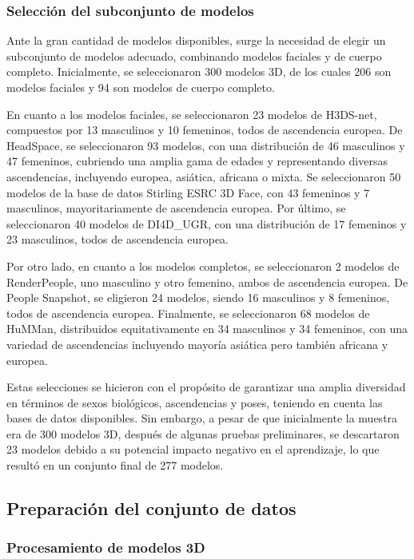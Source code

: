 \subsubsection{Selección del subconjunto de modelos}

Ante la gran cantidad de modelos disponibles, surge la necesidad de elegir un subconjunto de modelos adecuado, combinando modelos faciales y de cuerpo completo.
Inicialmente, se seleccionaron 300 modelos 3D, de los cuales 206 son modelos faciales y 94 son modelos de cuerpo completo.

En cuanto a los modelos faciales, se seleccionaron 23 modelos de H3DS-net, compuestos por 13 masculinos y 10 femeninos, todos de ascendencia europea. De HeadSpace, se seleccionaron 93 modelos, con una distribución de 46 masculinos y 47 femeninos, cubriendo una amplia gama de edades y representando diversas ascendencias, incluyendo europea, asiática, africana o mixta. Se seleccionaron 50 modelos de la base de datos Stirling ESRC 3D Face, con 43 femeninos y 7 masculinos, mayoritariamente de ascendencia europea. Por último, se seleccionaron 40 modelos de DI4D\_UGR, con una distribución de 17 femeninos y 23 masculinos, todos de ascendencia europea.

Por otro lado, en cuanto a los modelos completos, se seleccionaron 2 modelos de RenderPeople, uno masculino y otro femenino, ambos de ascendencia europea. De People Snapshot, se eligieron 24 modelos, siendo 16 masculinos y 8 femeninos, todos de ascendencia europea. Finalmente, se seleccionaron 68 modelos de HuMMan, distribuidos equitativamente en 34 masculinos y 34 femeninos, con una variedad de ascendencias incluyendo mayoría asiática pero también africana y europea.

Estas selecciones se hicieron con el propósito de garantizar una amplia diversidad en términos de sexos biológicos, ascendencias y poses, teniendo en cuenta las bases de datos disponibles. Sin embargo, a pesar de que inicialmente la muestra era de 300 modelos 3D, después de algunas pruebas preliminares, se descartaron 23 modelos debido a su potencial impacto negativo en el aprendizaje, lo que resultó en un conjunto final de 277 modelos.

\subsection{Preparación del conjunto de datos}\label{gen-img}

\subsubsection{Procesamiento de modelos 3D}

